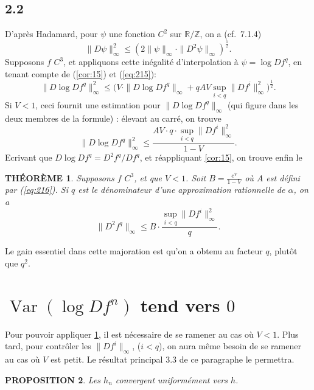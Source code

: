 \documentclass[12pt]{amsart}
\theoremstyle{plain}
\newtheorem{theoreme}{TH\'{E}OR\`{E}ME}[section]
\newtheorem{proposition}[theoreme]{PROPOSITION}
\theoremstyle{remark}
\DeclareMathOperator*{\Var}{Var}
\begin{document}
\subsection*{2.2}
D'apr\`{e}s Hadamard, pour $\psi$ une fonction $C^{2}$ sur $\mathbb{R}/\mathbb{Z}$, on a (cf.~7.1.4)
\begin{equation}\label{eq:221}
\|D\psi\|_{\infty}^{2} \leq (2\|\psi\|_{\infty} \cdot \|D^{2}\psi\|_{\infty})^{\frac{1}{2}} .
\end{equation}
Supposons $f$ $C^{3}$, et appliquons cette in\'{e}galit\'{e} d'interpolation \`{a} $\psi = \log Df^{q}$, en tenant compte de (\ref{cor:15}) et (\ref{eq:215}):
\begin{equation}\label{eq:222}
\|D\log Df^{q}\|_{\infty}^{2} \leq \bigl(V \cdot \|D\log Df^{q}\|_{\infty} + qAV \sup_{i < q} \|Df^{i}\|_{\infty}^{2}\bigr)^{\frac{1}{2}} .
\end{equation}
Si $V < 1$, ceci fournit une estimation pour $\|D\log Df^{q}\|_{\infty}$ (qui figure dans les deux membres de la formule) : \'{e}levant au carr\'{e}, on trouve
\[
\|D\log Df^{q}\|_{\infty}^{2} \leq \frac{AV \cdot q \cdot \sup_{i<q}\|Df^{i}\|_{\infty}^{2}}{1-V} .
\]
Ecrivant que $D\log Df^{q} = D^{2}f^{q}/Df^{q}$, et r\'{e}appliquant \ref{cor:15}, on trouve enfin le

\begin{theoreme}\label{thm:23}
Supposons $f$ $C^{3}$, et que $V < 1$. Soit $B = \frac{e^{V}}{1-V}$ o\`{u} $A$ est d\'{e}fini par (\ref{eq:216}). Si $q$ est le d\'{e}nominateur d'une approximation rationnelle de $\alpha$, on a
\[
\|D^{2}f^{q}\|_{\infty} \leq B \cdot \frac{\sup_{i<q}\|Df^{i}\|_{\infty}^{2}}{q} .
\]
\end{theoreme}

Le gain essentiel dans cette majoration est qu'on a obtenu au facteur $q$, plut\^{o}t que $q^{2}$.

\section{$\Var(\log Df^{n})$ tend vers $0$}

Pour pouvoir appliquer \ref{thm:23}, il est n\'{e}cessaire de se ramener au cas o\`{u} $V < 1$. Plus tard, pour contr\^{o}ler les $\|Df^{i}\|_{\infty}$, ($i < q$), on aura m\^{e}me besoin de se ramener au cas o\`{u} $V$ est petit. Le r\'{e}sultat principal 3.3 de ce paragraphe le permettra.

\begin{proposition}\label{prop:31}
Les $h_{n}$ convergent uniform\'{e}ment vers $h$.
\end{proposition}
\end{document}
